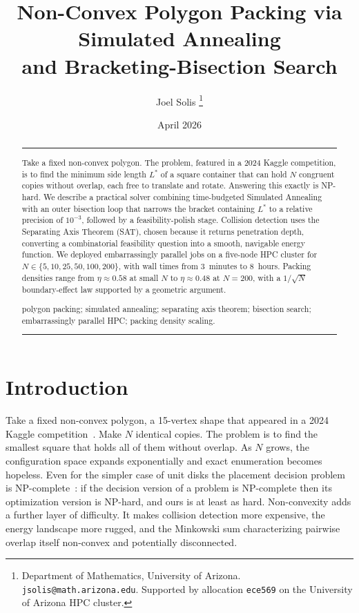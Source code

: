 \documentclass[10pt,twocolumn]{article}
\title{%
  \Large\bfseries
  Non-Convex Polygon Packing via Simulated Annealing\\[4pt]
  and Bracketing-Bisection Search%
}
\author{%
  Joel Solis%
  \thanks{Department of Mathematics, University of Arizona.
    \texttt{jsolis@math.arizona.edu}.
    Supported by allocation \texttt{ece569} on the
    University of Arizona HPC cluster.}%
}
\date{April 2026}
\begin{document}
\maketitle
\thispagestyle{firstpage}

\begin{abstract}
\vspace{-2pt}
\noindent\rule{\linewidth}{0.4pt}\vspace{4pt}

\enspace\small
Take a fixed non-convex polygon. The problem, featured in a 2024
Kaggle competition, is to find the minimum side length $L^*$ of a
square container that can hold $N$ congruent copies without overlap,
each free to translate and rotate. Answering this exactly is NP-hard.
We describe a practical solver combining time-budgeted Simulated
Annealing with an outer bisection loop that narrows the bracket
containing $L^*$ to a relative precision of $10^{-3}$, followed by a
feasibility-polish stage. Collision detection uses the Separating Axis
Theorem (SAT), chosen because it returns penetration depth, converting
a combinatorial feasibility question into a smooth, navigable energy
function. We deployed embarrassingly parallel jobs on a five-node
HPC cluster for $N \in \{5, 10, 25, 50, 100, 200\}$, with wall times
from 3~minutes to 8~hours. Packing densities range from
$\eta \approx 0.58$ at small $N$ to $\eta \approx 0.48$ at $N = 200$,
with a $1/\!\sqrt{N}$ boundary-effect law supported by a geometric
argument.

\vspace{5pt}
\enspace\small
polygon packing; simulated annealing; separating axis theorem;
bisection search; embarrassingly parallel HPC; packing density scaling.

\vspace{4pt}
\noindent\rule{\linewidth}{0.4pt}\vspace{2pt}
\end{abstract}

\section{Introduction}
\label{sec:intro}

Take a fixed non-convex polygon, a 15-vertex shape that appeared in a
2024 Kaggle competition~\cite{kaggle2024}. Make $N$ identical copies.
The problem is to find the smallest square that holds all of them
without overlap. As $N$ grows, the configuration space expands
exponentially and exact enumeration becomes hopeless. Even for the
simpler case of unit disks the placement decision problem is
NP-complete~\cite{demaine2007}: if the decision version of a problem
is NP-complete then its optimization version is NP-hard, and ours is
at least as hard. Non-convexity adds a further layer of difficulty.
It makes collision detection more expensive, the energy landscape more
rugged, and the Minkowski sum characterizing pairwise overlap itself
non-convex and potentially disconnected.
\end{document}
